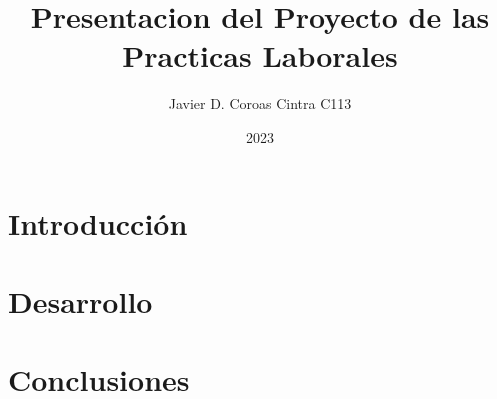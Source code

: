 \documentclass{article}
\title{Presentacion del Proyecto de las Practicas Laborales}
\author{Javier D. Coroas Cintra C113}
\date{2023}
\begin{document}
\maketitle

\section{Introducción} 
%

\section{Desarrollo}
%

\section{Conclusiones}
%
\end{document}
